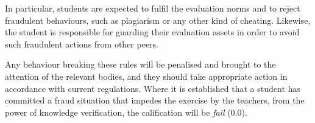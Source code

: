 \documentclass[11pt, a4paper, twoside]{article}
\begin{document}
In particular, students are expected to fulfil the evaluation norms and to
reject fraudulent behaviours, such as plagiarism or any other kind of cheating.
Likewise, the student is responsible for guarding their evaluation assets in
order to avoid such fraudulent actions from other peers.

Any behaviour breaking these rules will be penalised and brought to the
attention of the relevant bodies, and they should take appropriate action in
accordance with current regulations. Where it is established that a student has
committed a fraud situation that impedes the exercise by the teachers, from the
power of knowledge verification, the calification will be \emph{fail} (0.0).
\end{document}
